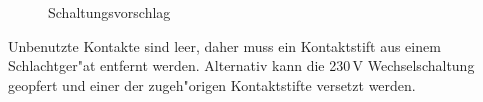 \documentclass[ngerman,11pt,parskip=half] {scrartcl}
\begin{document}
\begin{figure}[H]
\centering
{}
\caption{Schaltungsvorschlag} \label{fig:1}
\end{figure}

Unbenutzte Kontakte sind leer, daher muss ein Kontaktstift aus einem Schlachtger"at entfernt werden. Alternativ kann die 230\,V Wechselschaltung geopfert und einer der zugeh"origen Kontaktstifte versetzt werden.
\end{document}
